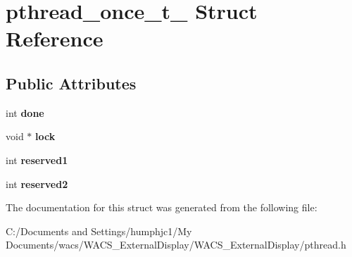 \hypertarget{structpthread__once__t__}{
\section{pthread\_\-once\_\-t\_\- Struct Reference}
\label{structpthread__once__t__}
}
\subsection*{Public Attributes}
\begin{DoxyCompactItemize}
\item 
\hypertarget{structpthread__once__t___a863ce43daa3b264c20a79f9c3eb65b06}{
int {\bfseries done}}
\label{structpthread__once__t___a863ce43daa3b264c20a79f9c3eb65b06}

\item 
\hypertarget{structpthread__once__t___a9e674c271b3500a3fb315ba6a26587d8}{
void $\ast$ {\bfseries lock}}
\label{structpthread__once__t___a9e674c271b3500a3fb315ba6a26587d8}

\item 
\hypertarget{structpthread__once__t___ac92841b1c04034128491e463297b4c3d}{
int {\bfseries reserved1}}
\label{structpthread__once__t___ac92841b1c04034128491e463297b4c3d}

\item 
\hypertarget{structpthread__once__t___aaef156d8d36d991e6f113b0ec0c481b4}{
int {\bfseries reserved2}}
\label{structpthread__once__t___aaef156d8d36d991e6f113b0ec0c481b4}

\end{DoxyCompactItemize}


The documentation for this struct was generated from the following file:\begin{DoxyCompactItemize}
\item 
C:/Documents and Settings/humphjc1/My Documents/wacs/WACS\_\-ExternalDisplay/WACS\_\-ExternalDisplay/pthread.h\end{DoxyCompactItemize}
